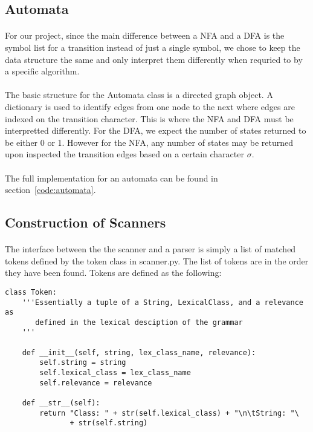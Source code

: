 \documentclass{article}
\begin{document}
\subsection{Automata}
\paragraph{} For our project, since the main difference between
a NFA and a DFA is the symbol list for a transition instead of just a
single symbol, we chose to keep the data structure the same and only
interpret them differently when requried to by a specific algorithm.

\paragraph{} The basic structure for the Automata class is a directed
graph object. A dictionary is used to identify edges from one node to
the next where edges are indexed on the transition character. This is
where the NFA and DFA must be interpretted differently. For the DFA,
we expect the number of states returned to be either 0 or 1. However
for the NFA, any number of states may be returned upon inspected the
transition edges based on a certain character $\sigma$.

\paragraph{} The full implementation for an automata can be found in section~\ref{code:automata}.

\subsection{Construction of Scanners}
\paragraph{} The interface between the the scanner and a parser is simply a list of matched tokens defined by the token class in scanner.py. The list of tokens are in the order they have been found. Tokens are defined as the following:

\begin{verbatim}
class Token:
    '''Essentially a tuple of a String, LexicalClass, and a relevance as
       defined in the lexical desciption of the grammar
    '''

    def __init__(self, string, lex_class_name, relevance):
        self.string = string
        self.lexical_class = lex_class_name
        self.relevance = relevance

    def __str__(self):
        return "Class: " + str(self.lexical_class) + "\n\tString: "\
               + str(self.string)
\end{verbatim}
\end{document}
